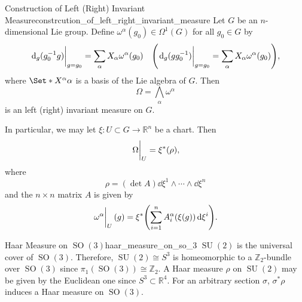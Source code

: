 \documentclass{article}
\begin{document}
\begin{theorem}{Construction of Left (Right) Invariant Measure}{constrcution_of_left_right_invariant_measure}
    Let $G$ be an $n$-dimensional Lie group.
    Define $\omega^\alpha(g_0)\in \Omega^1(G)$ for all $g_0\in G$ by
    \[ \eval{\dd_g(g_0^{-1}g)}_{g = g_0} = \sum_{\alpha} X_\alpha \omega^\alpha(g_0) \quad \qty(\eval{\dd_g(g g_0^{-1})}_{g = g_0} = \sum_{\alpha} X_\alpha \omega^\alpha(g_0)), \]
    where $\Set*{X^\alpha}{\alpha}$ is a basis of the Lie algebra of $G$.
    Then
    \[ \Omega = \bigwedge_{\alpha} \omega^\alpha \]
    is an left (right) invariant measure on $G$.
\end{theorem}

In particular, we may let $\xi: U\subset G \rightarrow \mathbb{R}^n$ be a chart.
Then
\[ \eval{\Omega}_U = \xi^*(\rho), \]
where
\[ \rho = (\det A) \dd \xi^1 \wedge \cdots \wedge \dd \xi^n \]
and the $n\times n$ matrix $A$ is given by
\[ \eval{\omega^\alpha}_U(g) = \xi^*\qty(\sum_{i=1}^n A^\alpha_i(\xi(g)) \dd{\xi^i}). \]

\begin{example}{Haar Measure on $\operatorname{SO}(3)$}{haar_measure_on_so_3}
    $\operatorname{SU}(2)$ is the universal cover of $\operatorname{SO}(3)$.
    Therefore, $\operatorname{SU}(2) \cong S^3$ is homeomorphic to a $\mathbb{Z}_2$-bundle over $\operatorname{SO}(3)$ since $\pi_1(\operatorname{SO}(3)) \cong \mathbb{Z}_2$.
    A Haar measure $\rho$ on $\operatorname{SU}(2)$ may be given by the Euclidean one since $S^3\subset \mathbb{R}^4$.
    For an arbitrary section $\sigma$, $\sigma^* \rho$ induces a Haar measure on $\operatorname{SO}(3)$.
\end{example}

% 
% 
\end{document}
